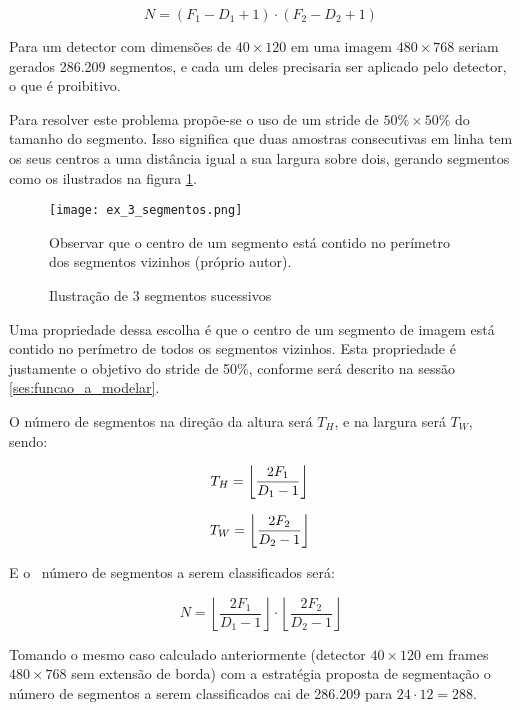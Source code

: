 \begin{equation}
	N = (F_1 - D_1 + 1) \cdot (F_2 - D_2 + 1)
\end{equation}

Para um detector com dimensões  de $40 \times 120$ em uma imagem
$480 \times 768$ seriam gerados 286.209 segmentos, e cada um deles precisaria
ser aplicado pelo detector, o que é proibitivo.

Para resolver este problema propõe-se o uso de um stride de
$50\% \times 50\%$ do tamanho do segmento. Isso significa que duas amostras
consecutivas em linha tem os seus centros a uma distância igual a sua
largura sobre dois, gerando segmentos como os ilustrados na figura
\ref{fig:ex_3_segmentos}.

\begin{figure}[!htb]
	\centering
	\texttt{[image: ex\_3\_segmentos.png]}
	\caption{Ilustração de 3 segmentos sucessivos}
	\label{fig:ex_3_segmentos}
	Observar que o centro de um segmento está contido no perímetro dos
	segmentos vizinhos (próprio autor).
\end{figure}

Uma propriedade dessa escolha é que o centro de um segmento de imagem está
contido no perímetro de todos os segmentos vizinhos. Esta propriedade é
justamente o objetivo do stride de 50\%, conforme será descrito na sessão
\ref{ses:funcao_a_modelar}.

O número de segmentos na direção da altura será $T_H$, e na largura será
$T_W$, sendo:

\begin{equation}
	T_H=\left\lfloor \frac{2F_1}{D_1-1} \right\rfloor \\
\end{equation}

\begin{equation}
	T_W=\left\lfloor \frac{2F_2}{D_2-1} \right\rfloor \\
\end{equation}

E o  número de segmentos a serem classificados será:

\begin{equation}
	N=\left\lfloor \frac{2F_1}{D_1-1} \right\rfloor \cdot
		\left\lfloor \frac{2F_2}{D_2-1} \right\rfloor
\end{equation}

Tomando o mesmo caso calculado anteriormente (detector $40 \times 120$ em
frames $480 \times 768$ sem extensão de borda) com a estratégia proposta
de segmentação o número de segmentos a serem classificados cai de 286.209
para $24 \cdot 12=288$.

